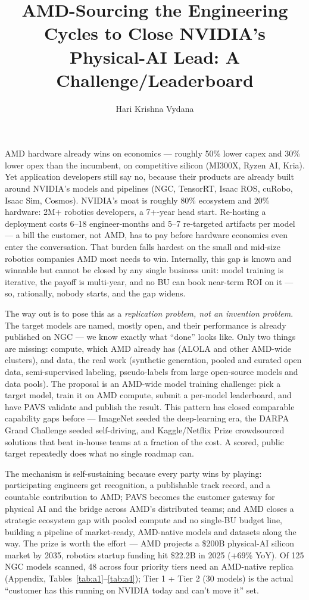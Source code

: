 \documentclass[10pt,onecolumn]{IEEEtran}
\title{AMD-Sourcing the Engineering Cycles to Close NVIDIA's Physical-AI Lead: A Challenge/Leaderboard}
\author{Hari Krishna Vydana}
\begin{document}
\maketitle

\pagestyle{fancy}
\fancyhf{}
\cfoot{\thepage}
\renewcommand{\headrulewidth}{0pt}
\thispagestyle{fancy}

\large

AMD hardware already wins on economics --- roughly 50\% lower capex and 30\% lower opex than the incumbent, on competitive silicon (MI300X, Ryzen AI, Kria). Yet application developers still say no, because their products are already built around NVIDIA's models and pipelines (NGC, TensorRT, Isaac ROS, cuRobo, Isaac Sim, Cosmos). NVIDIA's moat is roughly 80\% ecosystem and 20\% hardware: 2M+ robotics developers, a 7+-year head start. Re-hosting a deployment costs 6--18 engineer-months and 5--7 re-targeted artifacts per model --- a bill the customer, not AMD, has to pay before hardware economics even enter the conversation. That burden falls hardest on the small and mid-size robotics companies AMD most needs to win. Internally, this gap is known and winnable but cannot be closed by any single business unit: model training is iterative, the payoff is multi-year, and no BU can book near-term ROI on it --- so, rationally, nobody starts, and the gap widens.

The way out is to pose this as a \textit{replication problem, not an invention problem}. The target models are named, mostly open, and their performance is already published on NGC --- we know exactly what ``done'' looks like. Only two things are missing: compute, which AMD already has (ALOLA and other AMD-wide clusters), and data, the real work (synthetic generation, pooled and curated open data, semi-supervised labeling, pseudo-labels from large open-source models and data pools). The proposal is an AMD-wide model training challenge: pick a target model, train it on AMD compute, submit a per-model leaderboard, and have PAVS validate and publish the result. This pattern has closed comparable capability gaps before --- ImageNet seeded the deep-learning era, the DARPA Grand Challenge seeded self-driving, and Kaggle/Netflix Prize crowdsourced solutions that beat in-house teams at a fraction of the cost. A scored, public target repeatedly does what no single roadmap can.

The mechanism is self-sustaining because every party wins by playing: participating engineers get recognition, a publishable track record, and a countable contribution to AMD; PAVS becomes the customer gateway for physical AI and the bridge across AMD's distributed teams; and AMD closes a strategic ecosystem gap with pooled compute and no single-BU budget line, building a pipeline of market-ready, AMD-native models and datasets along the way. The prize is worth the effort --- AMD projects a \$200B physical-AI silicon market by 2035, robotics startup funding hit \$22.2B in 2025 (+69\% YoY). Of 125 NGC models scanned, 48 across four priority tiers need an AMD-native replica (Appendix, Tables~\ref{tab:a1}--\ref{tab:a4}); Tier 1 + Tier 2 (30 models) is the actual ``customer has this running on NVIDIA today and can't move it'' set.
\end{document}
